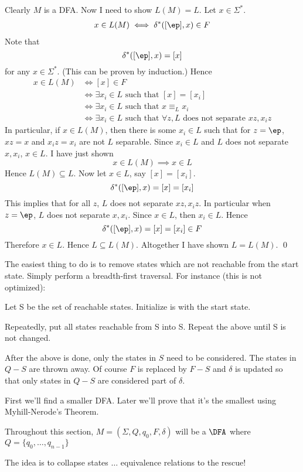 Clearly $M$ is a DFA.
Now I need to show $L(M) = L$.
Let $x \in \Sigma^*$.
\begin{align*}
  x \in L(M) \iff \delta^*([\ep], x) \in F
\end{align*}
Note that
\[
\delta^*([\ep], x) = [x]
\]
for any $x \in \Sigma^*$. (This can be proven by induction.)
Hence
\begin{align*}
  x \in L(M)
  &\iff [x] \in F \\
  &\iff \exists x_i \in L \text{ such that } [x] = [x_i] \\
  &\iff \exists x_i \in L \text{ such that } x \equiv_L x_i \\
  &\iff \exists x_i \in L \text{ such that } \forall z,
  L \text{ does not separate }
  xz, x_iz 
\end{align*}
In particular, if $x \in L(M)$, then
there is some $x_i \in L$ such that for $z = \ep$,
$xz=x$ and $x_iz=x_i$ are not $L$ separable.
Since $x_i \in L$ and $L$ does not separate $x,x_i$, $x \in L$.
I have just shown
\[
x \in L(M) \implies x \in L
\]
Hence $L(M) \subseteq L$.
Now let $x \in L$, say $[x] = [x_i]$.
\[
\delta^*([\ep], x) = [x] = [x_i] 
\]
This implies that for all $z$, $L$ does not separate
$xz,x_iz$.
In particular when $z = \ep$,
$L$ does not separate
$x,x_i$.
Since $x \in L$, then $x_i \in L$.
Hence
\[
\delta^*([\ep], x) = [x] = [x_i] \in F
\]
Therefore $x \in L$. Hence $L \subseteq L(M)$.
Altogether I have shown $L = L(M)$.
\qed


The easiest thing to do is to remove states which are not
reachable from the start state.
Simply perform a breadth-first traversal.
For instance (this is not optimized):
\begin{console}
Let S be the set of reachable states. Initialize is with the start state.

Repeatedly, put all states reachable from S into S.
Repeat the above until S is not changed.
\end{console}
After the above is done, only the states in $S$ need to be
considered.
The states in $Q - S$ are thrown away.
Of course $F$ is replaced by $F - S$ and $\delta$ is
updated so that only states in $Q - S$ are considered part of $\delta$.

First we'll find a smaller DFA. Later we'll prove that it's the
smallest using Myhill-Nerode's Theorem.

Throughout this section, $M = (\Sigma,Q,q_0,F,\delta)$ will be a $\DFA$
where $Q = \{q_0,\ldots,q_{n-1}\}$

The idea is to collapse states $\ldots$ equivalence relations to
the rescue!


